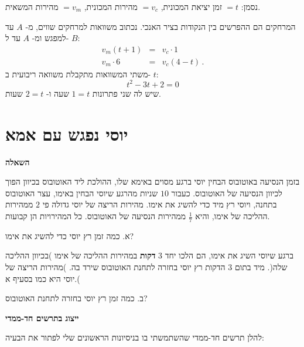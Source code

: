 \documentclass[12pt,a4paper]{article}
\begin{document}
נסמן:
$=t$
זמן יציאת המכונית,
$=v_c$
מהירות המכונית,
$=v_m$
מהירות המשאית.


המרחקים הם ההפרשים בין הנקודות בציר האנכי. נכתוב משוואות למרחקים שווים, מ-
$A$
עד למפגש ומ-
$A$
עד ל-
$B$:
\begin{eqnarray*}
v_m(t+1) &=& v_c\cdot 1\\
v_m \cdot 6 &=& v_c (4-t)\,.
\end{eqnarray*}
משתי המשוואות מתקבלת משוואה ריבועית ב-
$t$:
\[
t^2 - 3t + 2 = 0
\]
שיש לה שני פתרונות
$1=t$
שעה ו-
$2=t$
שעות.





\newpage

\section*{יוסי נפגש עם אמא}

\textbf{השאלה}

בזמן הנסיעה באוטובוס הבחין יוסי ברגע מסוים באימא שלו, ההולכת ליד האוטובוס 
בכיוון הפוך לכיוון הנסיעה של האוטובוס. כעבור
$10$
שניות מהרגע שיוסי הבחין באימו, עצר האוטובוס בתחנה, ויוסי רץ מיד כדי להשיג את אימו. מהירות הריצה של יוסי גדולה פי
$2$
ממהירות ההליכה של אימו, והיא
$\frac{1}{7}$
ממהירות הנסיעה של האוטובוס. כל המהירויות הן קבועות.

א. כמה זמן רץ יוסי כדי להשיג את אימו?

ברגע שיוסי השיג את אימו, הם הלכו יחד
$3$
\textbf{דקות}
במהירות ההליכה של אימו )בכיוון ההליכה שלה(. מיד בתום
$3$
הדקות רץ יוסי בחזרה לתחנת האוטובוס שירד בה. )מהירות הריצה של יוסי היא כמו בסעיף א.(

ב. כמה זמן רץ יוסי בחזרה לתחנת האוטובוס?


\bigskip

\textbf{ייצוג בתרשים חד-ממדי}

להלן תרשים חד-ממדי שהשתמשתי בו בניסיונות הראשונים שלי לפתור את הבעיה:

\begin{center}
\end{center}
\vspace*{-6ex}
\end{document}
